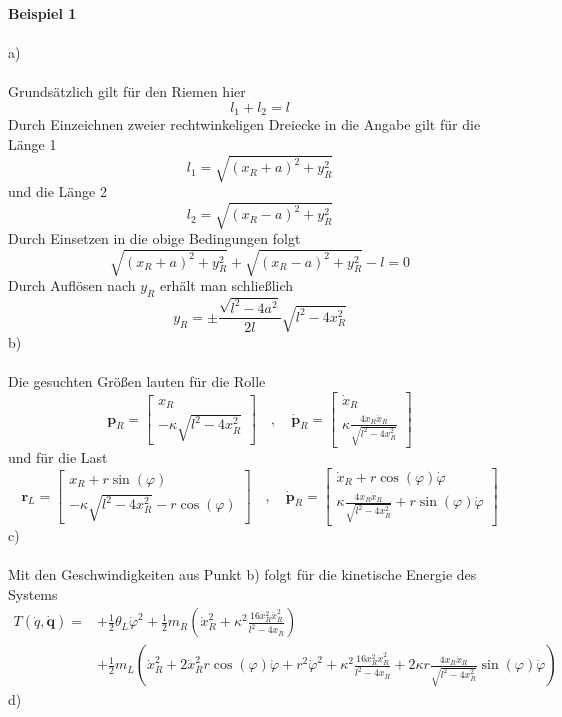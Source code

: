 \textbf{Beispiel 1}\\ \\
a)\\ \\
Grundsätzlich gilt für den Riemen hier
\[
	l_1 + l_2 = l
\]
Durch Einzeichnen zweier rechtwinkeligen Dreiecke in die Angabe gilt für die Länge 1 
\[
	l_1 = \sqrt{(x_R + a)^2 + y_R^2}
\]
und die Länge 2
\[
	l_2 = \sqrt{(x_R - a)^2 + y_R^2}
\]
Durch Einsetzen in die obige Bedingungen folgt
\[
	\sqrt{(x_R + a)^2 + y_R^2} + \sqrt{(x_R - a)^2 + y_R^2} - l = 0
\]
Durch Auflösen nach $y_R$ erhält man schließlich
\[
	y_R = \pm \frac{\sqrt{l^2 - 4a^2}}{2l}\sqrt{l^2 - 4x_R^2}
\]
b)\\ \\
Die gesuchten Größen lauten für die Rolle
\[
	\textbf{p}_R = \begin{bmatrix}
		x_R \\
		-\kappa\sqrt{l^2 - 4x_R^2}
	\end{bmatrix}
	\quad,\quad
	\dot{\textbf{p}}_R = \begin{bmatrix}
		\dot{x}_R \\
		\kappa\frac{4x_R\dot{x}_R}{\sqrt{l^2 - 4x_R^2}}
	\end{bmatrix}
\]
und für die Last
\[
	\textbf{r}_L = \begin{bmatrix}
		x_R + r\sin(\varphi) \\
		-\kappa\sqrt{l^2 - 4x_R^2} - r\cos(\varphi)
	\end{bmatrix}
	\quad,\quad
	\dot{\textbf{p}}_R = \begin{bmatrix}
	\dot{x}_R + r\cos(\varphi)\dot{\varphi}\\
	\kappa\frac{4x_R\dot{x}_R}{\sqrt{l^2 - 4x_R^2}} + r\sin(\varphi)\dot{\varphi}
	\end{bmatrix}
\]
c)\\ \\
Mit den Geschwindigkeiten aus Punkt b) folgt für die kinetische Energie des Systems
\begin{align*}
	T(\dot{q},\dot{\textbf{q}}) = &+\frac{1}{2}\theta_L\dot{\varphi}^2 + \frac{1}{2}m_R\left(\dot{x}_R^2 + \kappa^2\frac{16x^2_R\dot{x}^2_R}{l^2 - 4x_R}\right) \\
	&+ \frac{1}{2}m_L\left(\dot{x}_R^2 + 2\dot{x}_R^2r\cos(\varphi)\dot{\varphi} + r^2\dot{\varphi}^2 + \kappa^2\frac{16x^2_R\dot{x}^2_R}{l^2 - 4x_R} + 2\kappa r\frac{4x_R\dot{x}_R}{\sqrt{l^2 - 4x_R^2}}\sin(\varphi)\dot{\varphi}\right)
\end{align*}
d)\\ \\
